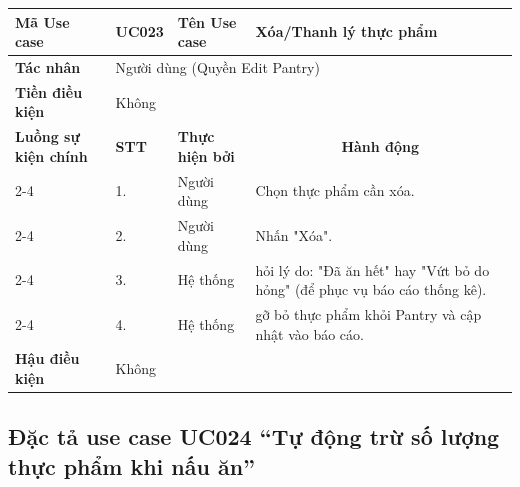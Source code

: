 \documentclass[../main.tex]{subfiles}
\begin{document}
\begin{longtable}{|p{2.7cm}|p{0.8cm}|p{2.6cm}|p{7.3cm}|}
\hline
\cellcolor[HTML]{D5F5E3}\textbf{Mã Use case} & \multicolumn{1}{l|}{UC023} & \cellcolor[HTML]{D5F5E3}\textbf{Tên Use case} & Xóa/Thanh lý thực phẩm \\ \hline
\cellcolor[HTML]{D5F5E3}\textbf{Tác nhân} & \multicolumn{3}{p{10.7cm}|}{Người dùng (Quyền Edit Pantry)} \\ \hline
\cellcolor[HTML]{D5F5E3}\textbf{Tiền điều kiện} & \multicolumn{3}{p{10.7cm}|}{Không} \\ \hline

\cellcolor[HTML]{D5F5E3}\textbf{Luồng sự kiện chính} & \cellcolor[HTML]{FDEBD0}\textbf{STT} & \cellcolor[HTML]{FDEBD0}\textbf{Thực hiện bởi} & \multicolumn{1}{c|}{\cellcolor[HTML]{FDEBD0}\textbf{Hành động}} \\ \cline{2-4} 
\cellcolor[HTML]{D5F5E3} & 1. & Người dùng & Chọn thực phẩm cần xóa. \\ \cline{2-4} 
\cellcolor[HTML]{D5F5E3} & 2. & Người dùng & Nhấn "Xóa". \\ \cline{2-4} 
\cellcolor[HTML]{D5F5E3} & 3. & Hệ thống & hỏi lý do: "Đã ăn hết" hay "Vứt bỏ do hỏng" (để phục vụ báo cáo thống kê). \\ \cline{2-4} 
\cellcolor[HTML]{D5F5E3} & 4. & Hệ thống & gỡ bỏ thực phẩm khỏi Pantry và cập nhật vào báo cáo. \\ \hline

\cellcolor[HTML]{D5F5E3}\textbf{Hậu điều kiện} & \multicolumn{3}{p{10.7cm}|}{Không} \\ \hline
\end{longtable}
\endgroup

\subsection{Đặc tả use case UC024 ``Tự động trừ số lượng thực phẩm khi nấu ăn''}
\vspace{0.5cm}

\begingroup
\renewcommand{\arraystretch}{1.5}
\end{document}
